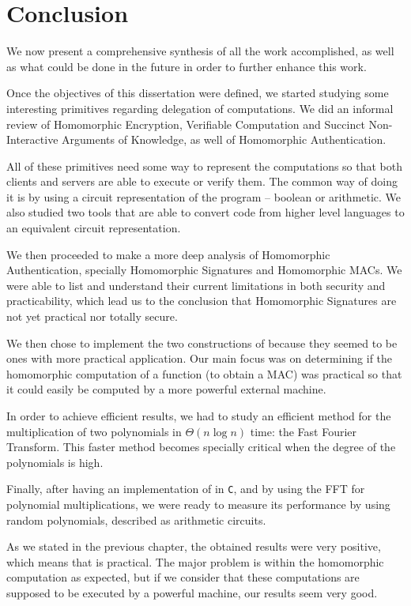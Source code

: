 \chapter{Conclusion}\label{chap:conclusion}
We now present a comprehensive synthesis of all the work accomplished, as well
as what could be done in the future in order to further enhance this work.

Once the objectives of this dissertation were defined, we started studying some
interesting primitives regarding delegation of computations. We did an informal
review of Homomorphic Encryption, Verifiable Computation and Succinct
Non-Interactive Arguments of Knowledge, as well of Homomorphic Authentication.

All of these primitives need some way to represent the computations so that
both clients and servers are able to execute or verify them. The common way of
doing it is by using a circuit representation of the program -- boolean or
arithmetic. We also studied two tools that are able to convert code from higher
level languages to an equivalent circuit representation.

We then proceeded to make a more deep analysis of Homomorphic Authentication,
specially Homomorphic Signatures and Homomorphic MACs. We were able to
list and understand their current limitations in both security and
practicability, which lead us to the conclusion that Homomorphic Signatures are
not yet practical nor totally secure.

We then chose to implement the two constructions of
\textcite{catalano:fiore:2013} because they seemed to be ones with more
practical application. Our main focus was on determining if the homomorphic
computation of a function (to obtain a MAC) was practical so that it could
easily be computed by a more powerful external machine.

In order to achieve efficient results, we had to study an efficient method for
the multiplication of two polynomials in $\Theta(n \log{n})$ time: the Fast
Fourier Transform. This faster method becomes specially critical when the
degree of the polynomials is high.

Finally, after having an implementation of \textcite{catalano:fiore:2013} in
\texttt{C}, and by using the FFT for polynomial multiplications, we were ready
to measure its performance by using random polynomials, described as arithmetic
circuits.

As we stated in the previous chapter, the obtained results were very positive,
which means that \textcite{catalano:fiore:2013} is practical. The major problem
is within the homomorphic computation as expected, but if we consider that these
computations are supposed to be executed by a powerful machine, our results
seem very good.

